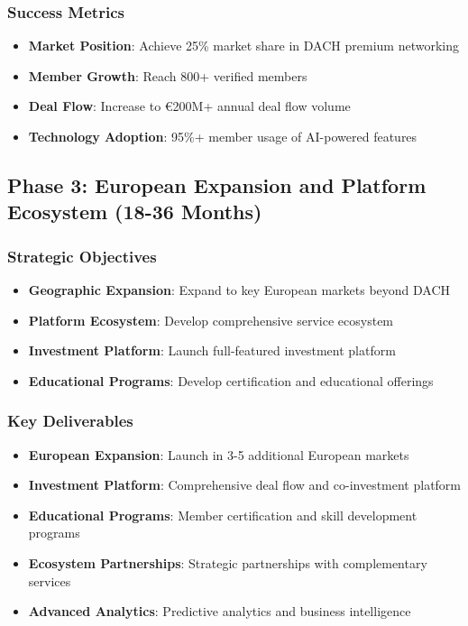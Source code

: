 \subsubsection{Success Metrics}
\begin{itemize}
    \item \textbf{Market Position}: Achieve 25\% market share in DACH premium networking
    \item \textbf{Member Growth}: Reach 800+ verified members
    \item \textbf{Deal Flow}: Increase to €200M+ annual deal flow volume
    \item \textbf{Technology Adoption}: 95\%+ member usage of AI-powered features
\end{itemize}

\subsection{Phase 3: European Expansion and Platform Ecosystem (18-36 Months)}

\subsubsection{Strategic Objectives}
\begin{itemize}
    \item \textbf{Geographic Expansion}: Expand to key European markets beyond DACH
    \item \textbf{Platform Ecosystem}: Develop comprehensive service ecosystem
    \item \textbf{Investment Platform}: Launch full-featured investment platform
    \item \textbf{Educational Programs}: Develop certification and educational offerings
\end{itemize}

\subsubsection{Key Deliverables}
\begin{itemize}
    \item \textbf{European Expansion}: Launch in 3-5 additional European markets
    \item \textbf{Investment Platform}: Comprehensive deal flow and co-investment platform
    \item \textbf{Educational Programs}: Member certification and skill development programs
    \item \textbf{Ecosystem Partnerships}: Strategic partnerships with complementary services
    \item \textbf{Advanced Analytics}: Predictive analytics and business intelligence
\end{itemize}

